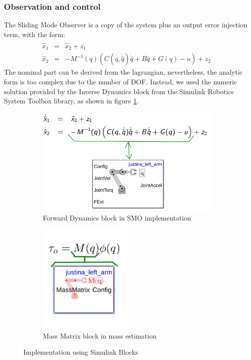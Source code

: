 \documentclass[a4paper, 10pt]{article}
\begin{document}
\subsubsection*{Observation and control}
The Sliding Mode Observer is a copy of the system plus an output error injection term, with the form:
\begin{eqnarray}
  \dot{\hat{x}}_1 &=& \hat{x}_2 + z_1\label{eq:observer1}\\
  \dot{\hat{x}}_2 &=& -M^{-1}(q)\left(C(q, \dot{\hat{q}})\dot{\hat{q}} + B\dot{\hat{q}} + G(q) - u\right) + z_2\label{eq:observer2}
\end{eqnarray}
  The nominal part can be derived from the lagrangian, nevertheless, the analytic form is too complex due to the number of DOF. Instead, we used the numeric solution provided by the Inverse Dynamics block from the Simulink Robotics System Toolbox library, as shown in figure \ref{fig:SimulinkSMO}.
\begin{figure}[h!]
  \centering
  \begin{subfigure}{0.45\textwidth}
  \centering
  \includegraphics[width=\textwidth]{Figures/SMOwithSimulink.png}
  \caption{Forward Dynamics block in SMO implementation}
  \label{fig:SimulinkSMO}
  \end{subfigure}
  \begin{subfigure}{0.45\textwidth}
  \centering
  \includegraphics[width=0.5\textwidth]{Figures/MassEst.png}
  \caption{Mass Matrix block in mass estimation}
  \label{fig:SimulinkMassEst}
  \end{subfigure}
  \caption{Implementation using Simulink Blocks}
\end{figure}
  
\end{document}
